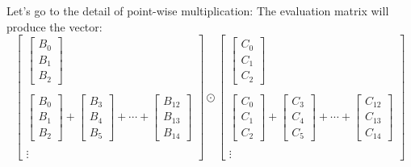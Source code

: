 \documentclass[
11pt,notheorems,hyperref={pdfauthor=whatever}
]{beamer}
\begin{document}
\begin{frame}
    Let's go to the detail of point-wise multiplication:
    The evaluation matrix will produce the vector:
    \[
    \begin{bmatrix}
        \begin{bmatrix}
            B_{0} \\ B_{1} \\ B_{2}
        \end{bmatrix}\\ \\
        \begin{bmatrix}
            B_{0} \\ B_{1} \\ B_{2}
        \end{bmatrix}+
        \begin{bmatrix}
            B_{3} \\ B_{4} \\ B_{5}
        \end{bmatrix}+\cdots+\begin{bmatrix}
            B_{12} \\ B_{13} \\ B_{14}
        \end{bmatrix}
        \\ \\
        \vdots
    \end{bmatrix}
    \odot    
    \begin{bmatrix}
        \begin{bmatrix}
            C_{0} \\ C_{1} \\ C_{2}
        \end{bmatrix}\\ \\
        \begin{bmatrix}
            C_{0} \\ C_{1} \\ C_{2}
        \end{bmatrix}+
        \begin{bmatrix}
            C_{3} \\ C_{4} \\ C_{5}
        \end{bmatrix}+\cdots+\begin{bmatrix}
            C_{12} \\ C_{13} \\ C_{14}
        \end{bmatrix}
        \\ \\
        \vdots
    \end{bmatrix}
    \]
\end{frame}
\end{document}
